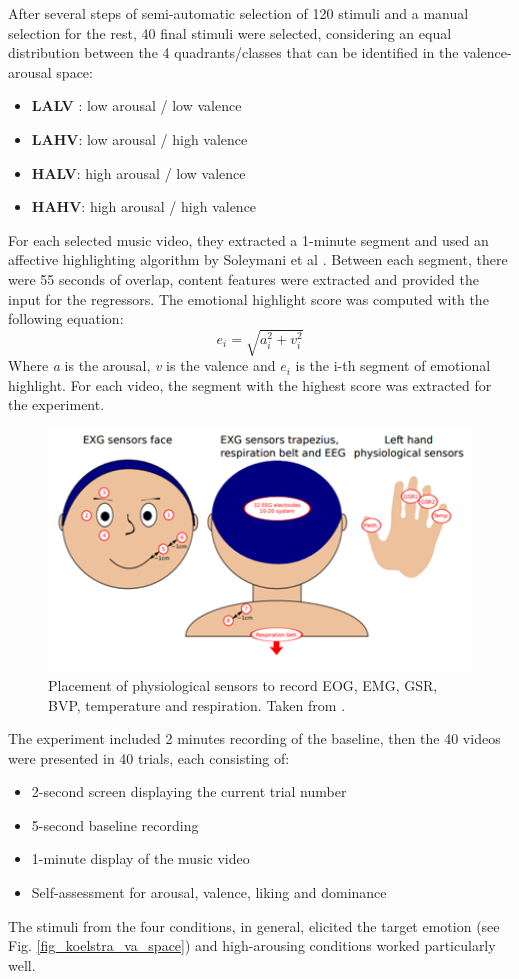 After several steps of semi-automatic selection of 120 stimuli and a manual selection for the rest, 40 final stimuli were selected, considering an equal distribution between the 4 quadrants/classes that can be identified in the valence-arousal space:
\begin{itemize}
\item 	\textbf{LALV} : low arousal / low valence
\item 	\textbf{LAHV}: low arousal / high valence
\item  	\textbf{HALV}: high arousal / low valence
\item     \textbf{HAHV}: high arousal / high valence
\end{itemize}


For each selected music video, they extracted a 1-minute segment and used an affective highlighting algorithm by Soleymani et al \cite{soleymani_bayesian_2009}. Between each segment, there were 55 seconds of overlap, content features were extracted and provided the input for the regressors. The emotional highlight score was computed with the following equation: 
\[ e_i= \sqrt{a_i^2 + v_i^2} \]
Where \emph{a} is the arousal, \emph{v} is the valence and \(e_i\) is the i-th  segment of emotional highlight. For each video, the segment with the highest score was extracted for the experiment.

\begin{figure}[h!]
\includegraphics[width=12cm]{img/related_work/koelstra_sensors.png}
\centering
\caption{Placement of physiological sensors to record EOG, EMG, GSR, BVP, temperature and respiration. Taken from \cite{koelstra_deap_2012}.}\label{fig_koelstra_sensors}
\end{figure}

The experiment included 2 minutes recording of the baseline, then the 40 videos were presented in 40 trials, each consisting of:
\begin{itemize}
\item 2-second screen displaying the current trial number
\item 5-second baseline recording
\item 1-minute display of the music video
\item Self-assessment for arousal, valence, liking and dominance
\end{itemize}
The stimuli from the four conditions, in general, elicited the target emotion (see Fig. \ref{fig_koelstra_va_space}) and high-arousing conditions worked particularly well.

